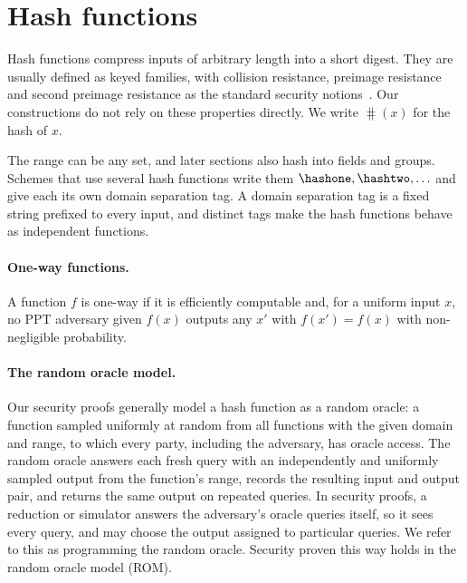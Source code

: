 \section{Hash functions}\label{sec:prelims-hash}

Hash functions compress inputs of arbitrary length into a short digest. They
are usually defined as keyed families, with collision resistance, preimage
resistance and second preimage resistance as the standard security
notions~\cite{KatLin14b}. Our constructions do not rely on these properties
directly. We write $\hash(x)$ for the
hash of $x$.

The range can be any set, and later sections also hash
into fields and groups. Schemes that use several hash functions write them
$\hashone, \hashtwo, \ldots$ and give each its own domain separation tag. A
domain separation tag is a fixed string prefixed to every input, and distinct
tags make the hash functions behave as independent functions.

\paragraph{One-way functions.} A function $f$ is one-way if it is efficiently
computable and, for a uniform input $x$, no PPT adversary given $f(x)$ outputs
any $x'$ with $f(x') = f(x)$ with non-negligible probability.

\paragraph{The random oracle model.} Our security
proofs generally model a hash
function as a random oracle: a function sampled uniformly at random from all
functions with the given domain and range, to which every party, including the
adversary, has oracle access. The random oracle answers each fresh query with an
independently and uniformly sampled output from the function's range, records
the resulting input and output pair, and returns the same output on repeated
queries. In security proofs, a reduction or simulator answers the adversary's
oracle queries itself, so it sees every query, and may choose the output
assigned to particular queries. We refer to this as programming the random
oracle. Security proven this way holds in the random oracle model (ROM).
